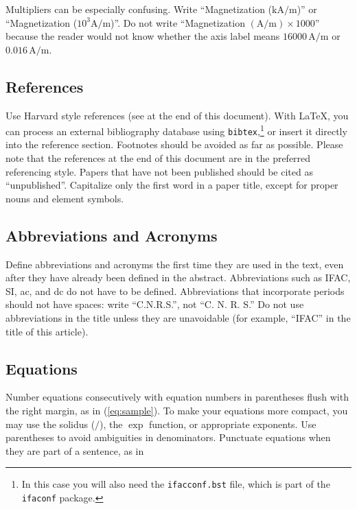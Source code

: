\documentclass{ifacconf}
\begin{document}
Multipliers can be especially confusing. Write ``Magnetization
($\mathrm{kA}/\mathrm{m}$)'' or ``Magnetization ($10^3 \mathrm{A}/\mathrm{m}$)''. Do not write
``Magnetization $(\mathrm{A}/\mathrm{m}) \times 1000$'' because the reader would not know
whether the axis label means $16000\,\mathrm{A}/\mathrm{m}$ or $0.016\,\mathrm{A}/\mathrm{m}$.

\subsection{References}

Use Harvard style references (see at the end of this document). With
\LaTeX, you can process an external bibliography database 
using \texttt{bibtex},\footnote{In this case you will also need the \texttt{ifacconf.bst}
file, which is part of the \texttt{ifaconf} package.}
or insert it directly into the reference section. Footnotes should be avoided as
far as possible.  Please note that the references at the end of this
document are in the preferred referencing style. Papers that have not
been published should be cited as ``unpublished''.  Capitalize only the
first word in a paper title, except for proper nouns and element
symbols.

\subsection{Abbreviations and Acronyms}

Define abbreviations and acronyms the first time they are used in the
text, even after they have already been defined in the
abstract. Abbreviations such as IFAC, SI, ac, and dc do not have to be
defined. Abbreviations that incorporate periods should not have
spaces: write ``C.N.R.S.'', not ``C. N. R. S.'' Do not use abbreviations
in the title unless they are unavoidable (for example, ``IFAC'' in the
title of this article).

\subsection{Equations}

Number equations consecutively with equation numbers in parentheses
flush with the right margin, as in (\ref{eq:sample}).  To make your equations more
compact, you may use the solidus ($/$), the $\exp$ function, or
appropriate exponents. Use parentheses to avoid ambiguities in
denominators. Punctuate equations when they are part of a sentence, as
in
\end{document}

